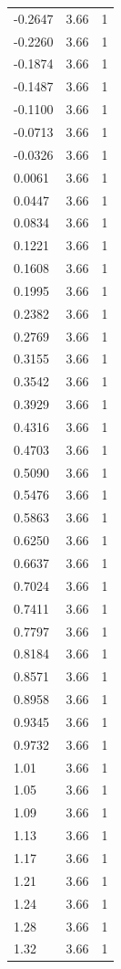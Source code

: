 \begin{longtable}{lrr}
  -0.2647 & 3.66 & 1 \\
  -0.2260 & 3.66 & 1 \\
  -0.1874 & 3.66 & 1 \\
  -0.1487 & 3.66 & 1 \\
  -0.1100 & 3.66 & 1 \\
  -0.0713 & 3.66 & 1 \\
  -0.0326 & 3.66 & 1 \\
  0.0061 & 3.66 & 1 \\
  0.0447 & 3.66 & 1 \\
  0.0834 & 3.66 & 1 \\
  0.1221 & 3.66 & 1 \\
  0.1608 & 3.66 & 1 \\
  0.1995 & 3.66 & 1 \\
  0.2382 & 3.66 & 1 \\
  0.2769 & 3.66 & 1 \\
  0.3155 & 3.66 & 1 \\
  0.3542 & 3.66 & 1 \\
  0.3929 & 3.66 & 1 \\
  0.4316 & 3.66 & 1 \\
  0.4703 & 3.66 & 1 \\
  0.5090 & 3.66 & 1 \\
  0.5476 & 3.66 & 1 \\
  0.5863 & 3.66 & 1 \\
  0.6250 & 3.66 & 1 \\
  0.6637 & 3.66 & 1 \\
  0.7024 & 3.66 & 1 \\
  0.7411 & 3.66 & 1 \\
  0.7797 & 3.66 & 1 \\
  0.8184 & 3.66 & 1 \\
  0.8571 & 3.66 & 1 \\
  0.8958 & 3.66 & 1 \\
  0.9345 & 3.66 & 1 \\
  0.9732 & 3.66 & 1 \\
  1.01 & 3.66 & 1 \\
  1.05 & 3.66 & 1 \\
  1.09 & 3.66 & 1 \\
  1.13 & 3.66 & 1 \\
  1.17 & 3.66 & 1 \\
  1.21 & 3.66 & 1 \\
  1.24 & 3.66 & 1 \\
  1.28 & 3.66 & 1 \\
  1.32 & 3.66 & 1 \\

\end{longtable}
